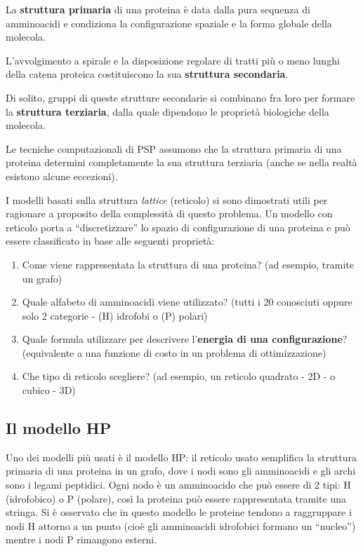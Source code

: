 \documentclass[conference]{IEEEtran}
\begin{document}
La \textbf{struttura primaria} di una proteina è data dalla pura sequenza di amminoacidi e condiziona la configurazione spaziale e la forma globale della molecola.

L'avvolgimento a spirale e la disposizione regolare di tratti più o meno lunghi della catena proteica costituiscono la sua \textbf{struttura secondaria}.

Di solito, gruppi di queste strutture secondarie si combinano fra loro per formare la \textbf{struttura terziaria}, dalla quale dipendono le proprietà biologiche della molecola.

Le tecniche computazionali di PSP assumono che la struttura primaria di una proteina determini completamente la sua struttura terziaria (anche se nella realtà esistono alcune eccezioni).

I modelli basati sulla struttura \textit{lattice} (reticolo) si sono dimostrati utili per ragionare a proposito della complessità di questo problema. Un modello con reticolo porta a ``discretizzare'' lo spazio di configurazione di una proteina e può essere classificato in base alle seguenti proprietà:

\begin{enumerate}
 \item Come viene rappresentata la struttura di una proteina? (ad esempio, tramite un grafo)
 \item Quale alfabeto di amminoacidi viene utilizzato? (tutti i 20 conosciuti oppure solo 2 categorie - (H) idrofobi o (P) polari)
 \item Quale formula utilizzare per descrivere l'\textbf{energia di una configurazione}? (equivalente a una funzione di costo in un problema di ottimizzazione)
 \item Che tipo di reticolo scegliere? (ad esempio, un reticolo quadrato - 2D - o cubico - 3D)
\end{enumerate}

\subsection{Il modello HP}

Uno dei modelli più usati è il modello HP: il reticolo usato semplifica la struttura primaria di una proteina in un grafo, dove i nodi sono gli amminoacidi e gli archi sono i legami peptidici. Ogni nodo è un amminoacido che può essere di 2 tipi: H (idrofobico) o P (polare), così la proteina può essere rappresentata tramite una stringa. Si è osservato che in questo modello le proteine tendono a raggruppare i nodi H attorno a un punto (cioè gli amminoacidi idrofobici formano un ``nucleo'') mentre i nodi P rimangono esterni.
\end{document}
